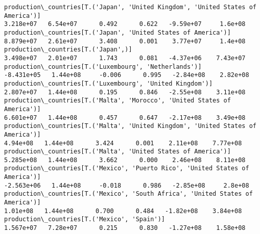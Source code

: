 \documentclass[11pt]{article}
\begin{document}
\begin{Verbatim}[commandchars=\\\{\}]
production\_countries[T.('Japan', 'United Kingdom', 'United States of America')]                                                                                                        3.218e+07   6.54e+07      0.492      0.622   -9.59e+07     1.6e+08
production\_countries[T.('Japan', 'United States of America')]                                                                                                                          8.879e+07   2.61e+07      3.408      0.001    3.77e+07     1.4e+08
production\_countries[T.('Japan',)]                                                                                                                                                     3.498e+07   2.01e+07      1.743      0.081   -4.37e+06    7.43e+07
production\_countries[T.('Luxembourg', 'Netherlands')]                                                                                                                                 -8.431e+05   1.44e+08     -0.006      0.995   -2.84e+08    2.82e+08
production\_countries[T.('Luxembourg', 'United Kingdom')]                                                                                                                               2.807e+07   1.44e+08      0.195      0.846   -2.55e+08    3.11e+08
production\_countries[T.('Malta', 'Morocco', 'United States of America')]                                                                                                               6.601e+07   1.44e+08      0.457      0.647   -2.17e+08    3.49e+08
production\_countries[T.('Malta', 'United Kingdom', 'United States of America')]                                                                                                         4.94e+08   1.44e+08      3.424      0.001    2.11e+08    7.77e+08
production\_countries[T.('Malta', 'United States of America')]                                                                                                                          5.285e+08   1.44e+08      3.662      0.000    2.46e+08    8.11e+08
production\_countries[T.('Mexico', 'Puerto Rico', 'United States of America')]                                                                                                         -2.563e+06   1.44e+08     -0.018      0.986   -2.85e+08     2.8e+08
production\_countries[T.('Mexico', 'South Africa', 'United States of America')]                                                                                                          1.01e+08   1.44e+08      0.700      0.484   -1.82e+08    3.84e+08
production\_countries[T.('Mexico', 'Spain')]                                                                                                                                            1.567e+07   7.28e+07      0.215      0.830   -1.27e+08    1.58e+08

\end{Verbatim}
\end{document}
